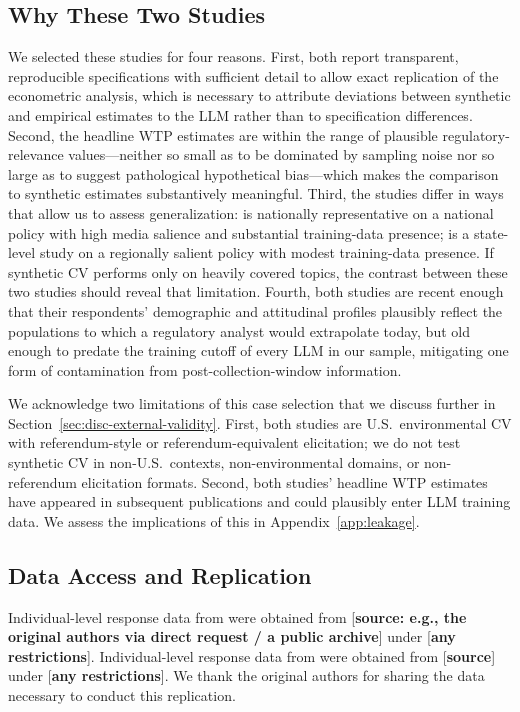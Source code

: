 \documentclass[12pt]{article}
\begin{document}
\subsection{Why These Two Studies}\label{sec:data-why}

We selected these studies for four reasons. First, both report transparent, reproducible specifications with sufficient detail to allow exact replication of the econometric analysis, which is necessary to attribute deviations between synthetic and empirical estimates to the LLM rather than to specification differences. Second, the headline WTP estimates are within the range of plausible regulatory-relevance values---neither so small as to be dominated by sampling noise nor so large as to suggest pathological hypothetical bias---which makes the comparison to synthetic estimates substantively meaningful. Third, the studies differ in ways that allow us to assess generalization: \textcite{Aldy2012} is nationally representative on a national policy with high media salience and substantial training-data presence; \textcite{Giguere2020} is a state-level study on a regionally salient policy with modest training-data presence. If synthetic CV performs only on heavily covered topics, the contrast between these two studies should reveal that limitation. Fourth, both studies are recent enough that their respondents' demographic and attitudinal profiles plausibly reflect the populations to which a regulatory analyst would extrapolate today, but old enough to predate the training cutoff of every LLM in our sample, mitigating one form of contamination from post-collection-window information.

We acknowledge two limitations of this case selection that we discuss further in Section~\ref{sec:disc-external-validity}. First, both studies are U.S.\ environmental CV with referendum-style or referendum-equivalent elicitation; we do not test synthetic CV in non-U.S.\ contexts, non-environmental domains, or non-referendum elicitation formats. Second, both studies' headline WTP estimates have appeared in subsequent publications and could plausibly enter LLM training data. We assess the implications of this in Appendix~\ref{app:leakage}.

\subsection{Data Access and Replication}\label{sec:data-access}

Individual-level response data from \textcite{Aldy2012} were obtained from [\textbf{source: e.g., the original authors via direct request / a public archive}] under [\textbf{any restrictions}]. Individual-level response data from \textcite{Giguere2020} were obtained from [\textbf{source}] under [\textbf{any restrictions}]. We thank the original authors for sharing the data necessary to conduct this replication.
\end{document}
